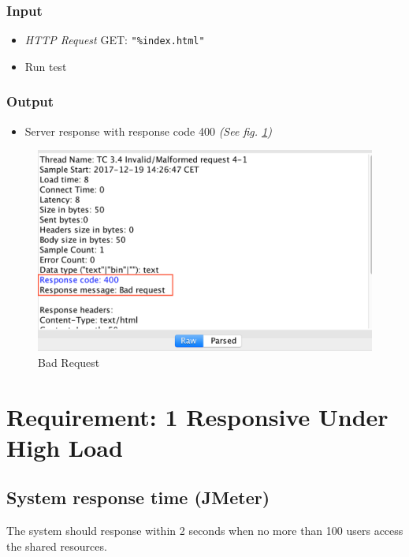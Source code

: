 \documentclass[a4paper, 12pt]{article}
\begin{document}
\subsubsection{Input}
\begin{itemize}
\item \textit{HTTP Request} GET: \texttt{"\%index.html"}
\item Run test
\end{itemize}

\subsubsection{Output}
\begin{itemize}
\item Server response with response code 400 \textit{(See fig. \ref{TC3.4})}
\end{itemize}

\begin{figure}[H]
\centering
\includegraphics[scale=0.7]{output_clarification/400BADREQUEST.png} 
\caption{Bad Request}
\label{TC3.4}
\end{figure}

\newpage
\section{Requirement: 1 Responsive Under High Load}

\subsection{System response time (JMeter)}

The system should response within 2 seconds when no more than 100 users access the shared resources.
\end{document}
